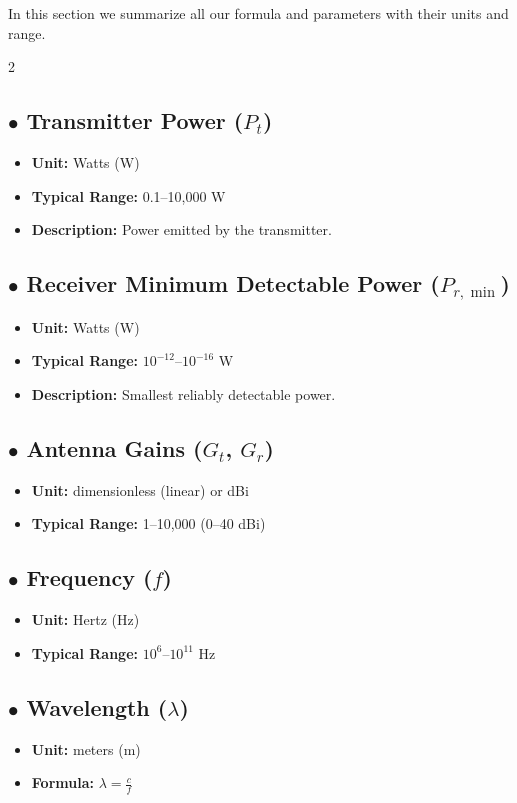 \documentclass{article}
\begin{document}
In this section we summarize all our formula and parameters with their units and range.
\begin{multicols}{2}
	\subsection*{$\bullet$ Transmitter Power ($P_t$)}
	\begin{itemize}
		\item \textbf{Unit:} Watts (W)
		\item \textbf{Typical Range:} 0.1--10,000 W
		\item \textbf{Description:} Power emitted by the transmitter.
	\end{itemize}
	
	\subsection*{$\bullet$ Receiver Minimum Detectable Power ($P_{r,\min}$)}
	\begin{itemize}
		\item \textbf{Unit:} Watts (W)
		\item \textbf{Typical Range:} $10^{-12}$--$10^{-16}$ W
		\item \textbf{Description:} Smallest reliably detectable power.
	\end{itemize}
	
	\subsection*{$\bullet$ Antenna Gains ($G_t$, $G_r$)}
	\begin{itemize}
		\item \textbf{Unit:} dimensionless (linear) or dBi
		\item \textbf{Typical Range:} 1--10,000 (0--40 dBi)
	\end{itemize}
	
	\subsection*{$\bullet$ Frequency ($f$)}
	\begin{itemize}
		\item \textbf{Unit:} Hertz (Hz)
		\item \textbf{Typical Range:} $10^6$--$10^{11}$ Hz
	\end{itemize}
	
	\subsection*{$\bullet$ Wavelength ($\lambda$)}
	\begin{itemize}
		\item \textbf{Unit:} meters (m)
		\item \textbf{Formula:} $\lambda = \frac{c}{f}$
	\end{itemize}
	

\end{multicols}
\end{document}
